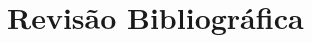 {
    \color{orange}
    \section{Revisão Bibliográfica} \label{sec:literature_review}
    \lipsum[1-3]
}
